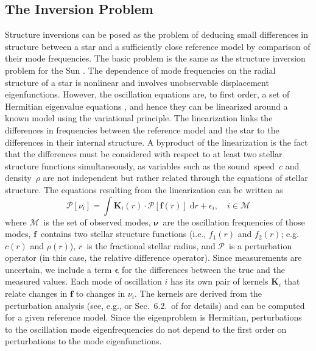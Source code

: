 %
%
%
\subsection{The Inversion Problem}
Structure inversions can be posed as the problem of deducing small differences in structure between a star and a sufficiently close reference model by comparison of their mode frequencies. 
The basic problem is the same as the structure inversion problem for the Sun \citep[for reviews of solar structure inversions, see for example][]{Kosovichev1999, 2016lrsp...13....2b}. 
The dependence of mode frequencies on the radial structure of a star is nonlinear and involves unobservable displacement eigenfunctions. 
However, the oscillation equations are, to first order, a set of Hermitian eigenvalue equations \citep{1964ApJ...139..664C}, and hence they can be linearized around a known model using the variational principle. 
The linearization links the differences in frequencies between the reference model and the star to the differences in their internal structure. 
A byproduct of the linearization is the fact that the differences must be considered with respect to at least two stellar structure functions simultaneously, as variables such as the sound~speed~$c$ and density~$\rho$ are not independent but rather related through the equations of stellar structure. 
The equations resulting from the linearization can be written as 
\begin{equation} \label{eq:inversion}
    \mathscr{P} [\nu_i] = \int \mathbf{K}_i(r) \cdot \mathscr{P} [\boldsymbol{f}(r)] \; \text{d}r + \epsilon_i, \quad i \in \mathscr{M}
\end{equation}
where $\mathscr{M}$~is the set of observed modes, 
$\boldsymbol{\nu}$~are the oscillation frequencies of those modes, 
$\boldsymbol{f}$~contains two stellar structure functions (i.e., ${f_1(r)}$ and ${f_2(r)}$; e.g.~${c(r)}$ and ${\rho(r)}$), 
$r$~is the fractional stellar radius, and 
${\mathscr{P}}$~is a perturbation operator (in this case, the relative difference operator). 
Since measurements are uncertain, we include a term $\boldsymbol \epsilon$ for the differences between the true and the measured values. 
Each mode of oscillation $i$ has its own pair of kernels $\mathbf {K}_i$ that relate changes in $\mathbf f$ to changes in $\nu_i$. 
The kernels are derived from the perturbation analysis (see, e.g., \citealt{GoughThompson1991} or Sec.~6.2.~of \citealt{2016lrsp...13....2b} for details) and can be computed for a given reference model. 
Since the eigenproblem is Hermitian, perturbations to the oscillation mode eigenfrequencies do not depend to the first order on perturbations to the mode eigenfunctions. 
